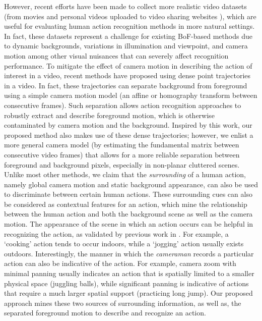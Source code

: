However, recent efforts have been made to collect more realistic video datasets (\eg from movies and personal videos uploaded to video sharing websites  \cite{kuehne2011,  marszalek2009}), which are useful for evaluating human action recognition methods in more natural settings. In fact, these datasets represent a challenge for existing BoF-based methods due to dynamic backgrounds, variations in illumination and viewpoint, and camera motion among other visual nuisances that can severely affect recognition performance. To mitigate the effect of camera motion in describing the action of interest in a video, recent methods \cite{wang2013,wang2011} have proposed using dense point trajectories in a video. In fact, these trajectories can separate background from foreground using a simple camera motion model (\ie an affine or homography transform between consecutive frames). Such separation allows action recognition approaches to robustly extract and describe foreground motion, which is otherwise contaminated by camera motion and the background. Inspired by this work, our proposed method also makes use of these dense trajectories; however, we enlist a more general camera model (by estimating the fundamental matrix between consecutive video frames) that allows for a more reliable separation between foreground and background pixels, especially in non-planar cluttered scenes. Unlike most other methods, we claim that the \emph{surrounding} of a human action, namely global camera motion and static background appearance, can also be used to discriminate between certain human actions. These surrounding cues can also be considered as contextual features for an action, which mine the relationship between the human action and both the background scene as well as the camera motion. The appearance of the scene in which an action occurs can be helpful in recognizing the action, as validated by previous work in \cite{marszalek2009}. For example, a `cooking' action tends to occur indoors, while a `jogging' action usually exists outdoors. Interestingly, the manner in which the \emph{cameraman} records a particular action can also be indicative of the action. For example, camera zoom with minimal panning usually indicates an action that is spatially limited to a smaller physical space (\eg juggling balls), while significant panning is indicative of actions that require a much larger spatial support (\eg practicing long jump).  Our proposed approach mines these two sources of surrounding information, as well as, the separated foreground motion to describe and recognize an action. 





